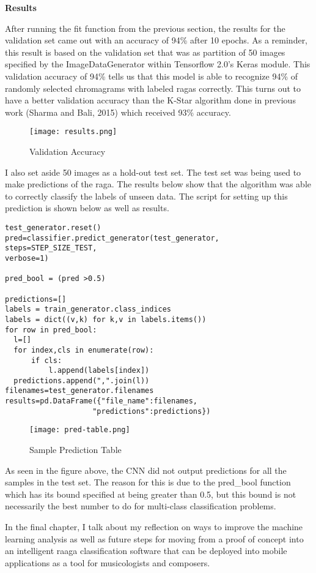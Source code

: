 \doublespacing
\setlength{\parindent}{1cm}

\begin{flushleft}
  \textbf{Results}
\end{flushleft}

After running the fit function from the previous section, the results for the validation set came out with an accuracy of 94\% after 10 epochs. As a reminder, this result is based on the validation set that was as partition of 50 images specified by the ImageDataGenerator within Tensorflow 2.0's Keras module. This validation accuracy of 94\% tells us that this model is able to recognize 94\% of randomly selected chromagrams with labeled ragas correctly. This turns out to have a better validation accuracy than the K-Star algorithm done in previous work (Sharma and Bali, 2015) which received 93\% accuracy.

\begin{figure}
  \caption{Validation Accuracy}
  \texttt{[image: results.png]}
\end{figure}

I also set aside 50 images as a hold-out test set. The test set was being used to make predictions of the raga. The results below show that the algorithm was able to correctly classify the labels of unseen data. The script for setting up this prediction is shown below as well as results.

\begin{lstlisting}
test_generator.reset()
pred=classifier.predict_generator(test_generator,
steps=STEP_SIZE_TEST,
verbose=1)

pred_bool = (pred >0.5)

predictions=[]
labels = train_generator.class_indices
labels = dict((v,k) for k,v in labels.items())
for row in pred_bool:
  l=[]
  for index,cls in enumerate(row):
      if cls:
          l.append(labels[index])
  predictions.append(",".join(l))
filenames=test_generator.filenames
results=pd.DataFrame({"file_name":filenames,
                    "predictions":predictions})
\end{lstlisting}

\begin{figure}
  \caption{Sample Prediction Table}
  \texttt{[image: pred-table.png]}
\end{figure}

As seen in the figure above, the CNN did not output predictions for all the samples in the test set. The reason for this is due to the pred\_bool function which has its bound specified at being greater than 0.5, but this bound is not necessarily the best number to do for multi-class classification problems.
\par
In the final chapter, I talk about my reflection on ways to improve the machine learning analysis as well as future steps for moving from a proof of concept into an intelligent raaga classification software that can be deployed into mobile applications as a tool for musicologists and composers.
